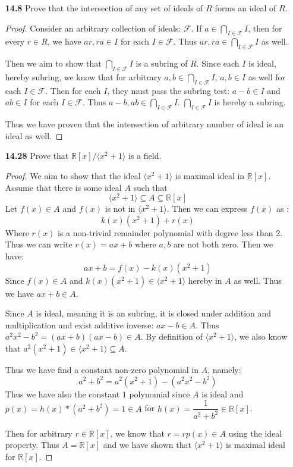 \documentclass[11pt, oneside]{article}
\newcommand{\R}{\mathbb R}
\begin{document}
\begin{enumerate}
 \newpage
\item[{\bf 14.8}] Prove that the intersection of any set of ideals of $R$ forms an ideal of $R$.
\begin{proof}
Consider an arbitrary collection of ideals: $\mathcal{F}$. If $a\in \bigcap_{I\in  \mathcal{F}} I$, then for every $r\in R$, we have $ar,ra\in I$ for each $I\in \mathcal{F} $. Thus $ar, ra\in   \bigcap_{I\in  \mathcal{F}} I$ as well. 

Then we aim to show that $ \bigcap_{I\in  \mathcal{F}} I$ is a subring of $R$. Since each $I$ is ideal, hereby subring, we know that for arbitrary $a,b\in  \bigcap_{I\in  \mathcal{F}} I$, $a,b\in I$ as well for each $I\in \mathcal{F}$. Then for each $I$, they must pass the subring test: $a-b\in I$ and $ab\in I$ for each $I\in \mathcal{F}$. Thus $a-b, ab\in  \bigcap_{I\in  \mathcal{F}} I$. $ \bigcap_{I\in  \mathcal{F}} I$ is hereby a subring. 

Thus we have proven that the intersection of arbitrary number of ideal is an ideal as well.
\end{proof}


\newpage
\item[{\bf 14.28}] Prove that $\R[x]/\langle x^2+1\rangle$ is a field.
\begin{proof}
We aim to show that the ideal $\langle x^2+1 \rangle$ is maximal ideal in $\R[x]$. Assume that there is some ideal $A$ such that 
\[\langle x^2+1 \rangle\subseteq A \subseteq \R[x]\]
Let $f(x)\in A$ and $f(x)$ is not in $\langle x^2+1 \rangle$. Then we can express $f(x)$ as :
\[k(x)(x^2+1)+r(x)\]
Where $r(x)$ is a non-trivial remainder polynomial with degree less than 2. Thus we can write $r(x)=ax+b$ where $a,b$ are not both zero. Then we have:
\[ax+b=f(x)-k(x)(x^2+1)\]
Since $f(x)\in A$ and $k(x)(x^2+1)\in  \langle x^2+1 \rangle$ hereby in $A$ as well. Thus we have $ax+b\in A$. 

Since $A$ is ideal, meaning it is an subring, it is closed under addition and multiplication and exist additive inverse: $ax-b\in A$. Thus $a^2x^2-b^2=(ax+b)(ax-b)\in A$. By definition of $\langle x^2+1 \rangle$, we also know that $a^2(x^2+1)\in \langle x^2+1 \rangle \subseteq A$.

Thus we have find a constant non-zero polynomial in $A$, namely:
\[a^2+b^2=a^2(x^2+1)-(a^2x^2-b^2)\]
Thus we have also the constant $1$ polynomial since $A$ is ideal and $p(x)=h(x)*(a^2+b^2)=1\in A$ for $h(x)=\dfrac{1}{a^2+b^2}\in \R[x]$. 

Then for arbitrary $r\in \R[x]$, we know that $r=rp(x)\in A$ using the ideal property. Thus $A=\R[x]$ and we have shown that $\langle x^2+1\rangle$ is maximal ideal for $\R[x]$.


\end{proof}
\end{enumerate}
\end{document}
